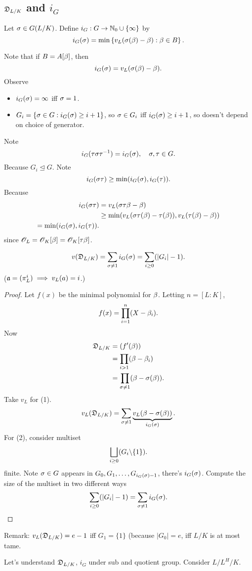 \subsection{$\mathfrak D_{L/K}$ and $i_G$}
\begin{df}
Let $\sigma\in G(L/K)$. 
Define $i_G:G\to \mathbb{N}_0\cup \{\infty\}$ by
\[
i_G(\sigma)=\min\left\{{v_L(\sigma(\beta)-\beta)}:{\beta\in B}\right\}.
\]
\end{df}
Note that if $B=A[\beta]$, then 
\[
i_G(\sigma)=v_L(\sigma(\beta)-\beta).
\]
Observe
\begin{itemize}
\item
$i_G(\sigma)=\infty$ iff $\sigma=1$.
\item
$G_i=\left\{{\sigma\in G}:{i_G(\sigma)\ge i+1}\right\}$, so $\sigma\in G_i$ iff $i_G(\sigma)\ge i+1$, so doesn't depend on choice of generator.
\end{itemize}
Note 
\[
i_G(\tau\sigma\tau^{-1})=i_G(\sigma),\quad \sigma,\tau\in G.
\]
Because $G_i\unlhd G$. Note
\[
i_G(\sigma\tau)\ge \min(i_G(\sigma),i_G(\tau)).
\]
Because
\begin{align*}
i_G(\sigma\tau)&=v_L(\sigma\tau\beta-\beta)\\
&\ge \min(v_L(\sigma\tau(\beta)-\tau(\beta)),v_L(\tau(\beta)-\beta))\\
=\min(i_G(\sigma),i_G(\tau)).
\end{align*}
since $\mathscr{O}_L=\mathscr{O}_K[\beta]=\mathscr{O}_K[\tau\beta]$.
\begin{pr}
\[
v(\mathfrak D_{L/K})=\sum_{\sigma\ne 1} i_G(\sigma)=\sum_{i\ge 0}(|G_i|-1).
\]
($\mathfrak{a}=(\pi_L^i)\implies v_L(a)=i$.)
\end{pr}
\begin{proof}
Let $f(x)$ be the minimal polynomial for $\beta$. Letting $n=[L:K]$, 
\[
f(x)=\prod_{i=1}^n(X-\beta_i).
\]
Now 
\begin{align*}
\mathfrak D_{L/K}&=(f'(\beta))\\
&=\prod_{i>1}(\beta-\beta_i)\\
&=\prod_{\sigma\ne 1}(\beta-\sigma(\beta)).
\end{align*}
Take $v_L$ for (1).
\[
v_L(\mathfrak D_{L/K})=\sum_{\sigma\ne 1}\underbrace{v_L(\beta-\sigma(\beta))}_{i_G(\sigma)}.
\]
For (2), consider multiset
\[
\bigsqcup_{i\ge 0} (G_i\backslash \{1\}).
\]
finite. Note $\sigma\in G$ appears in $G_0,G_1,\ldots, G_{i_G(\sigma)-1}$, there's $i_G(\sigma)$. Compute the size of the multiset in two different ways
\[
\sum_{i\ge 0} (|G_i|-1)=\sum_{\sigma\ne 1} i_G(\sigma).
\]
\end{proof}
Remark: $v_L(\mathfrak D_{L/K})=e-1$ iff $G_1=\{1\}$ (because $|G_0|=e$, iff $L/K$ is at most tame.

Let's understand $\mathfrak D_{L/K}$, $i_G$ under sub and quotient group. Consider $L/L^H/K$.

